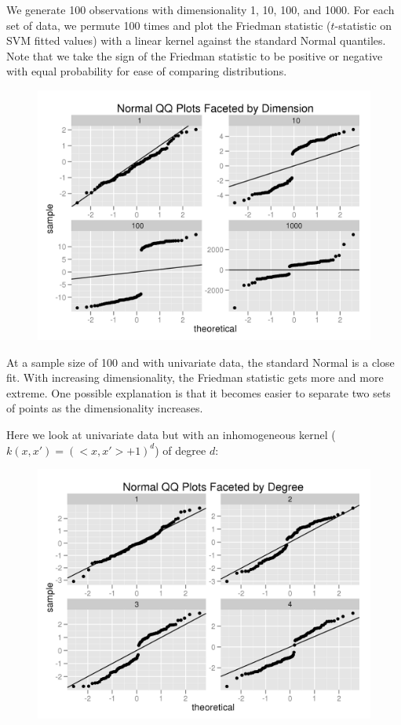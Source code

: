 We generate 100 observations with dimensionality 1, 10, 100, and
1000.  For each set of data, we permute 100 times and plot the
Friedman statistic ($t$-statistic on SVM fitted values) with a linear
kernel against the standard Normal quantiles.  Note that we take the
sign of the Friedman statistic to be positive or negative with equal
probability for ease of comparing distributions.
\begin{figure}[!ht]
  \centering
  \includegraphics{./simulations/ARC/multivar_qq.png}
\end{figure}

At a sample size of 100 and with univariate data, the standard Normal
is a close fit.  With increasing dimensionality, the Friedman
statistic gets more and more extreme.  One possible explanation is
that it becomes easier to separate two sets of points as the
dimensionality increases.
\clearpage

Here we look at univariate data but with an inhomogeneous kernel
($k(x, x') = (<x,x'>+1)^d$) of degree $d$:
\begin{figure}[!ht]
  \centering
  \includegraphics{./simulations/ARC/poly_ker_qq.png}
\end{figure}

